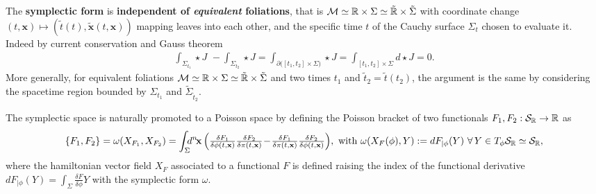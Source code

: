 \documentclass[../QFT_main.tex]{subfiles}
\begin{document}
\begin{mytheorem}
\noindent
The \textbf{symplectic form} is \textbf{independent of \emph{equivalent} foliations}, that is $\mathcal{M}\simeq \mathbb{R}\times \Sigma \simeq \tilde{\mathbb{R}}\times \tilde{\Sigma}$ with coordinate change $(t,\mathbf{x})\mapsto (\tilde{t}(t), \tilde{\mathbf{x}}(t,\mathbf{x}))$ mapping leaves into each other, and the specific time $t$ of the Cauchy surface $\Sigma_t$ chosen to evaluate it.
Indeed by current conservation and Gauss theorem
\begin{align}
    \int_{\Sigma_{t_1}}\!\!\!\!\star J \,\,- \int_{\Sigma_{t_2}}\!\!\!\! \star J 
    = \int_{\partial\big([t_1,t_2]\times \Sigma\big)} \!\!\!\!\!\!\star J
    = \int_{[t_1,t_2]\times \Sigma} d \!\star\! J =0.
\end{align}
More generally, for equivalent foliations $\mathcal{M}\simeq \mathbb{R}\times \Sigma \simeq \tilde{\mathbb{R}}\times \tilde{\Sigma}$ and two times $t_1$ and $\tilde{t}_2=\tilde{t}(t_2)$, the argument is the same by considering the spacetime region bounded by $\Sigma_{t_1}$ and $\tilde{\Sigma}_{\tilde{t}_2}$.

The symplectic space is naturally promoted to a Poisson space by defining the Poisson bracket of two functionals $F_1, F_2: \mathcal{S}_{\mathbb{R}} \to \mathbb{R}$ as
{\small\begin{align}
    \{F_1, F_2\} = \omega(X_{F_1}, X_{F_2})=\int_\Sigma\!\!\!d^n\!\mathbf{x}\, \Big( \tfrac{\delta F_1}{\delta \phi(t,\mathbf{x})}\tfrac{\delta F_2}{\delta \pi(t,\mathbf{x})} \!-\!\tfrac{\delta F_1}{\delta \pi(t,\mathbf{x})} \tfrac{\delta F_2}{\delta \phi(t,\mathbf{x})}\Big), \,\,\text{with}\,\, \omega(X_F(\phi), Y) := dF_{|\phi}(Y) \,\, \forall\, Y \in T_\phi \mathcal{S}_{\mathbb{R}} \simeq \mathcal{S}_{\mathbb{R}},
\end{align}}
where the hamiltonian vector field $X_F$ associated to a functional $F$ is defined raising the index of the functional derivative $dF_{|\phi}(Y) = \int_\Sigma \frac{\delta F}{\delta \phi} Y$ with the symplectic form $\omega$.


\end{mytheorem}
\end{document}
